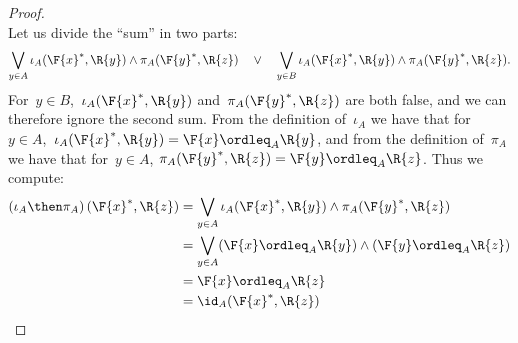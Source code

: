 \begin{proof}
\begin{equation}
    \end{equation}
    Let us divide the ``sum'' in two parts:
    \begin{equation}
        \bigvee_{y \in A} \iota_A(\F{x}^*,\R{y}) \wedge \pi_A(\F{y}^*,\R{z}) \quad\vee\quad
        \bigvee_{y \in B} \iota_A(\F{x}^*,\R{y}) \wedge \pi_A(\F{y}^*,\R{z}).
    \end{equation}
    For~$y \in B$,~$\iota_A(\F{x}^*,\R{y})$ and~$\pi_A(\F{y}^*,\R{z})$ are both false, and we can therefore ignore the second sum.
    From the definition of~$\iota_A$ we have that for~$y\in A$,~$ \iota_A(\F{x}^*,\R{y})=\F{x} \ordleq_A \R{y}$, and from the definition of~$\pi_A$ we have that for~$y\in A$, $\pi_A(\F{y}^*,\R{z})=\F{y} \ordleq_A \R{z}$.
    Thus we compute:
    \begin{equation}
        \begin{aligned}
            \left(\iota_A\then \pi_A\right)(\F{x}^*, \R{z}) & = \bigvee_{y \in A} \iota_A(\F{x}^*,\R{y}) \wedge \pi_A(\F{y}^*,\R{z})      \\
                                                            & = \bigvee_{y \in A} (\F{x} \ordleq_A \R{y}) \wedge  (\F{y} \ordleq_A \R{z}) \\
                                                            & = \F{x} \ordleq_A \R{z}                                                     \\
                                                            & = \id_A(\F{x}^*, \R{z})
        \end{aligned}
    \end{equation}
\end{proof}

